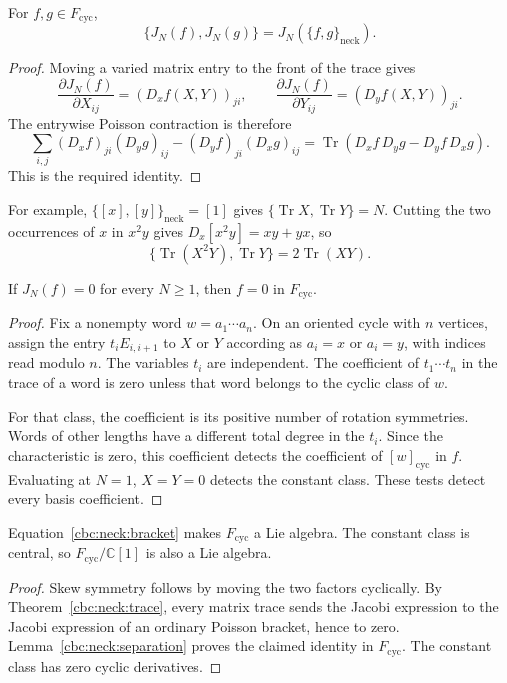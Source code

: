 \begin{theorem}\label{cbc:neck:trace}
For $f,g\in F_{\mathrm{cyc}}$,
\[
 \{J_N(f),J_N(g)\}=J_N(\{f,g\}_{\mathrm{neck}}).
\]
\end{theorem}
\begin{proof}
Moving a varied matrix entry to the front of the trace gives
\[
 \frac{\partial J_N(f)}{\partial X_{ij}}
 =(D_xf(X,Y))_{ji},\qquad
 \frac{\partial J_N(f)}{\partial Y_{ij}}
 =(D_yf(X,Y))_{ji}.
\]
The entrywise Poisson contraction is therefore
\[
 \sum_{i,j}(D_xf)_{ji}(D_yg)_{ij}
 -(D_yf)_{ji}(D_xg)_{ij}
 =\operatorname{Tr}(D_xf\,D_yg-D_yf\,D_xg).
\]
This is the required identity.
\end{proof}

For example, $\{[x],[y]\}_{\mathrm{neck}}=[1]$ gives
$\{\operatorname{Tr}X,\operatorname{Tr}Y\}=N$.  Cutting the two occurrences
of $x$ in $x^2y$ gives $D_x[x^2y]=xy+yx$, so
\[
 \{\operatorname{Tr}(X^2Y),\operatorname{Tr}Y\}
 =2\operatorname{Tr}(XY).
\]

\begin{lemma}\label{cbc:neck:separation}
If $J_N(f)=0$ for every $N\geq1$, then $f=0$ in $F_{\mathrm{cyc}}$.
\end{lemma}
\begin{proof}
Fix a nonempty word $w=a_1\cdots a_n$.  On an oriented cycle with $n$
vertices, assign the entry $t_iE_{i,i+1}$ to $X$ or $Y$ according as $a_i=x$
or $a_i=y$, with indices read modulo $n$.  The variables $t_i$ are independent.
The coefficient of $t_1\cdots t_n$ in the trace of a word is zero unless
that word belongs to the cyclic class of $w$.

For that class, the coefficient is its positive number of rotation
symmetries.  Words of other lengths have a different total degree in the
$t_i$.  Since the characteristic is zero, this coefficient detects the
coefficient of $[w]_{\mathrm{cyc}}$ in $f$.  Evaluating at $N=1$, $X=Y=0$
detects the constant class.  These tests detect every basis coefficient.
\end{proof}

\begin{proposition}\label{cbc:neck:lie}
Equation~\eqref{cbc:neck:bracket} makes $F_{\mathrm{cyc}}$ a Lie algebra.
The constant class is central, so $F_{\mathrm{cyc}}/\mathbb C[1]$ is also a
Lie algebra.
\end{proposition}
\begin{proof}
Skew symmetry follows by moving the two factors cyclically.  By
Theorem~\ref{cbc:neck:trace}, every matrix trace sends the Jacobi expression
to the Jacobi expression of an ordinary Poisson bracket, hence to zero.
Lemma~\ref{cbc:neck:separation} proves the claimed identity in
$F_{\mathrm{cyc}}$.  The constant class has zero cyclic derivatives.
\end{proof}

